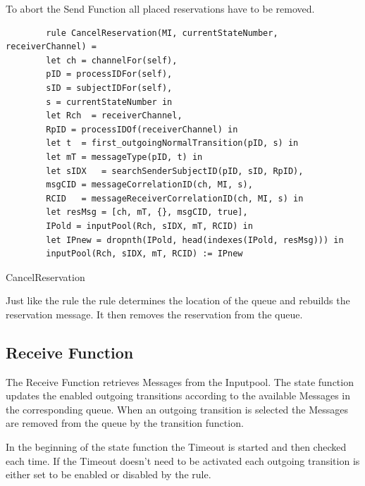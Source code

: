 To abort the Send Function all placed reservations have to be removed.


\begin{listing}[H]
	\begin{verbatim}
		rule CancelReservation(MI, currentStateNumber, receiverChannel) =
		let ch = channelFor(self),
		pID = processIDFor(self),
		sID = subjectIDFor(self),
		s = currentStateNumber in
		let Rch  = receiverChannel,
		RpID = processIDOf(receiverChannel) in
		let t  = first_outgoingNormalTransition(pID, s) in
		let mT = messageType(pID, t) in
		let sIDX   = searchSenderSubjectID(pID, sID, RpID),
		msgCID = messageCorrelationID(ch, MI, s),
		RCID   = messageReceiverCorrelationID(ch, MI, s) in
		let resMsg = [ch, mT, {}, msgCID, true],
		IPold = inputPool(Rch, sIDX, mT, RCID) in
		let IPnew = dropnth(IPold, head(indexes(IPold, resMsg))) in
		inputPool(Rch, sIDX, mT, RCID) := IPnew
	\end{verbatim}
	\caption{CancelReservation}
	\label{lst:shortasm:CancelReservation}
\end{listing}


Just like the  rule the
 rule determines the location of the queue and
rebuilds the reservation message. It then removes the reservation from the
queue.


\subsection{Receive Function}


The Receive Function retrieves Messages from the Inputpool. The state function
updates the enabled outgoing transitions according to the available Messages in
the corresponding queue. When an outgoing transition is selected the Messages
are removed from the queue by the transition function.


In the beginning of the state function the Timeout is started and then checked
each time.
If the Timeout doesn't need to be activated each outgoing transition is either set to
be enabled or disabled by the  rule.


